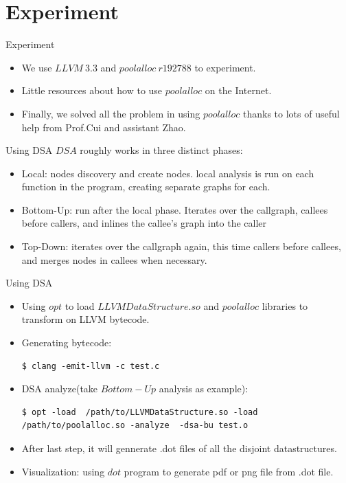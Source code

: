 \documentclass{beamer}
\begin{document}
\section{Experiment}

\begin{frame}{Experiment}
  \begin{itemize}
\setlength{\itemsep}{0.5cm}
	\item We use $LLVM\ 3.3$ and $poolalloc\ r192788$ to experiment.
	\item Little resources about how to use $poolalloc$ on the Internet.
	\item Finally, we solved all the problem in using $poolalloc$ thanks to lots of useful help from Prof.Cui and assistant Zhao.
  \end{itemize}
\end{frame}

\begin{frame}{Using DSA}
  $DSA$ roughly works in three distinct phases:
  \begin{itemize}
	  \setlength{\itemsep}{0.5cm}
	\item Local: nodes discovery and create nodes. local analysis is run on each function in the program, creating
separate graphs for each.
	  \item Bottom-Up: run after the local phase. Iterates over the callgraph, callees before
callers, and inlines the callee’s graph into the caller
\item Top-Down: iterates over the callgraph again, this time callers
before callees, and merges nodes in callees when necessary.
  \end{itemize}
\end{frame}

\begin{frame}[fragile]{Using DSA}
  \begin{itemize}
	\item Using $opt$ to load $LLVMDataStructure.so$ and $poolalloc$ libraries to transform on LLVM bytecode.
	  \item Generating bytecode: 
		\begin{lstlisting}
$ clang -emit-llvm -c test.c
\end{lstlisting}
	  \item DSA analyze(take $Bottom-Up$ analysis as example): 
		\begin{lstlisting}
$ opt -load  /path/to/LLVMDataStructure.so -load 
/path/to/poolalloc.so -analyze  -dsa-bu test.o
\end{lstlisting}
	  \item After last step, it will gennerate .dot files of all the disjoint datastructures. 
	  \item Visualization: using $dot$ program to generate pdf or png file from .dot file.
  \end{itemize}
\end{frame}
\end{document}
